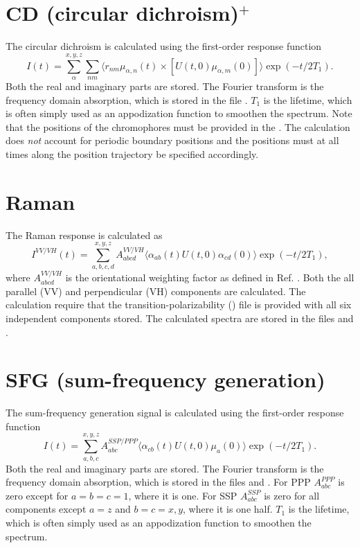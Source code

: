\section{CD (circular dichroism)$^{+}$}
The circular dichroism is calculated using the first-order response function
\begin{equation}
	I(t)=\sum_{\alpha}^{x,y,z}\sum_{nm}\langle r_{nm}\mu_{\alpha,n}(t)\times[U(t,0)\mu_{\alpha,m}(0)]\rangle\exp(-t/2T_1).
\end{equation}
Both the real and imaginary parts are stored.
The Fourier transform is the frequency domain absorption, which is stored in the file .
$T_1$ is the lifetime, which is often simply used as an appodization function to smoothen the spectrum.
Note that the positions of the chromophores must be provided in the .
The calculation does \textit{not} account for periodic boundary positions and the positions must at all times along the position trajectory be specified accordingly.

\section{Raman}
The Raman response is calculated as \cite{Torii.2002.J.Phys.Chem.A.106.3281,Shi.2012.J.Phys.Chem.B.116.13821}
\begin{equation}
        I^{VV/VH}(t)=\sum_{a,b,c,d}^{x,y,z}A^{VV/VH}_{abcd}\langle\alpha_{ab}(t)U(t,0)\alpha_{cd}(0)\rangle\exp(-t/2T_1),
\end{equation}
where $A^{VV/VH}_{abcd}$ is the orientational weighting factor as defined in Ref. . 
Both the all parallel (VV) and perpendicular (VH) components are calculated.
The calculation require that the transition-polarizability () file is provided with all six independent components stored.
The calculated spectra are stored in the files  and .

\section{SFG (sum-frequency generation)}
The sum-frequency generation signal is calculated using the first-order response function \cite{Roy.2014.J.Chem.Phys..141.18C502}
\begin{equation}
		I(t)=\sum_{a,b,c}^{x,y,z}A^{SSP/PPP}_{abc}\langle\alpha_{cb}(t)U(t,0)\mu_{a}(0)\rangle\exp(-t/2T_1).
\end{equation}
Both the real and imaginary parts are stored.
The Fourier transform is the frequency domain absorption, which is stored in the files  and .
For PPP $A^{PPP}_{abc}$ is zero except for $a=b=c=1$, where it is one.
For SSP $A^{SSP}_{abc}$ is zero for all components except $a=z$ and $b=c=x,y$, where it is one half.
$T_1$ is the lifetime, which is often simply used as an appodization function to smoothen the spectrum. 

